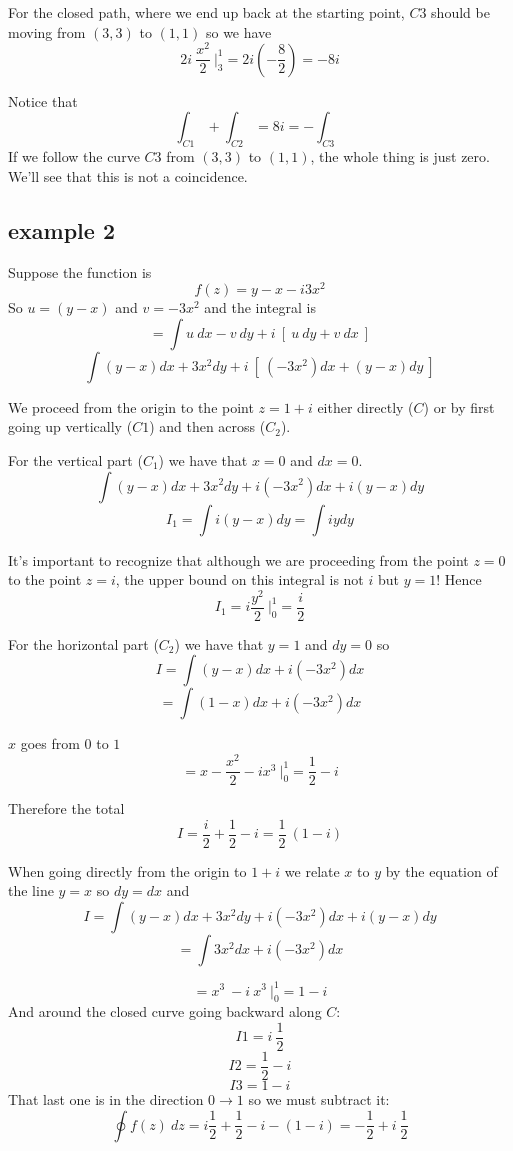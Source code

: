\documentclass[11pt, oneside]{article}
\begin{document}
For the closed path, where we end up back at the starting point, $C3$ should be moving from $(3,3)$ to $(1,1)$ so we have 
\[ 2i \ \frac{x^2}{2} \ \bigg |_3^1 = 2i ( - \frac{8}{2}) = -8i \]

Notice that 
\[ \int_{C1} + \int_{C2} = 8i  = - \int_{C3}\]
If we follow the curve $C3$ from $(3,3)$ to $(1,1)$, the whole thing is just zero.  We'll see that this is not a coincidence.

\subsection*{example 2}
Suppose the function is
\[ f(z) = y - x - i3x^2 \]
So $u = (y-x)$ and $v = -3x^2$ and the integral is
\[ = \int u \ dx - v \ dy + i \ [ \ u \ dy + v \ dx \ ] \]
\[ \int (y - x) dx + 3x^2 dy + i \ [ \ (-3x^2) dx + (y-x) dy \ ]  \]

We proceed from the origin to the point $z = 1 + i$ either directly ($C$) or by first going up vertically ($C1$) and then across ($C_2$).

For the vertical part ($C_1$) we have that $x = 0$ and $dx = 0$.
\[ \int (y - x) dx + 3x^2 dy + i (-3x^2) dx + i (y-x) dy \]
\[ I_1 = \int i (y-x) dy = \int i y dy \]

It's important to recognize that although we are proceeding from the point $z=0$ to the point $z = i$, the upper bound on this integral is not $i$ but $y = 1$!  Hence
\[ I_1 = i\frac{y^2}{2} \ \bigg |_0^1 = \frac{i}{2} \]

For the horizontal part ($C_2$) we have that $y=1$ and $dy = 0$ so
\[ I = \int (y - x) dx + i (-3x^2) dx  \]
\[ = \int (1 - x) dx + i (-3x^2) dx \]

$x$ goes from $0$ to $1$
\[ = x - \frac{x^2}{2} - ix^3 \ \bigg |_0^1 = \frac{1}{2} - i \]

Therefore the total
\[ I = \frac{i}{2} + \frac{1}{2} - i = \frac{1}{2} \ (1 - i) \]

When going directly from the origin to $1 + i$ we relate $x$ to $y$ by the equation of the line $y=x$ so $dy = dx$ and
\[ I = \int (y - x) dx + 3x^2 dy + i (-3x^2) dx + i (y-x) dy \]
\[ = \int 3x^2 dx + i (-3x^2) dx  \]

\[ =  x^3 \  -i  \ x^3 \ \bigg |_0^1  = 1  - i \]
And around the closed curve going backward along $C$:
\[ I1 = i \ \frac{1}{2} \]
\[ I2 = \frac{1}{2} - i \]
\[ I3 = 1 - i \]
That last one is in the direction $0 \rightarrow 1$ so we must subtract it:
\[ \oint f(z) \ dz = i \frac{1}{2} + \frac{1}{2} - i - (1  - i) =  -\frac{1}{2} + i \ \frac{1}{2} \]
\end{document}
